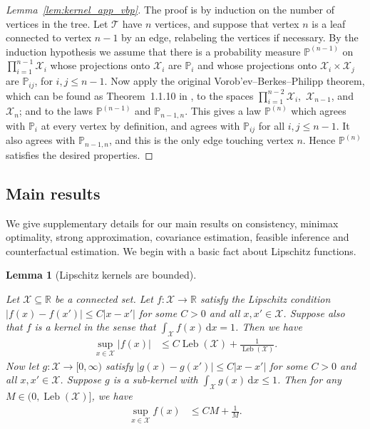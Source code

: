 \documentclass[11pt,lof]{puthesis}
\renewcommand{\P}{\ensuremath{\mathbb{P}}}
\newcommand{\R}{\ensuremath{\mathbb{R}}}
\newcommand{\cX}{\ensuremath{\mathcal{X}}}
\newcommand{\cT}{\ensuremath{\mathcal{T}}}
\DeclareMathOperator{\Leb}{Leb}
\newcommand{\diff}[1]{\,\mathrm{d}#1}
\theoremstyle{break}
\newtheorem{lemma}{Lemma}[section]
\theoremstyle{proof}
\newtheorem{proof}{Proof}
\begin{document}
\begin{proof}[Lemma~\ref{lem:kernel_app_vbp}]

The proof is by induction on the number of vertices in the tree.
Let $\cT$ have $n$ vertices,
and suppose that vertex $n$ is a leaf
connected to vertex $n-1$ by an edge,
relabeling the vertices if necessary.
By the induction hypothesis we assume that there is a
probability measure $\P^{(n-1)}$
on $\prod_{i=1}^{n-1} \cX_i$
whose projections onto $\cX_i$ are $\P_i$
and whose projections onto $\cX_i \times \cX_j$ are $\P_{i j}$,
for $i,j \leq n-1$.
Now apply the original
Vorob'ev--Berkes--Philipp theorem,
which can be found as Theorem~1.1.10 in
\citet{dudley1999uniform},
to the spaces
$\prod_{i=1}^{n-2} \cX_i$,\,
$\cX_{n-1}$, and
$\cX_n$;
and to the laws
$\P^{(n-1)}$
and
$\P_{n-1, n}$.
This gives a law $\P^{(n)}$
which agrees with $\P_i$
at every vertex by definition,
and agrees with
$\P_{i j}$ for all $i,j \leq n-1$.
It also agrees with $\P_{n-1,n}$,
and this is the only edge touching vertex $n$.
Hence $\P^{(n)}$ satisfies the desired properties.
\end{proof}

\subsection{Main results}
\label{sec:kernel_app_main}

We give supplementary details for our main results on consistency, minimax
optimality, strong approximation, covariance estimation, feasible inference and
counterfactual estimation.
We begin with a basic fact about Lipschitz functions.

\begin{lemma}[Lipschitz kernels are bounded]
\label{lem:kernel_app_lipschitz_kernels_bounded}

Let $\cX \subseteq \R$ be a connected set.
Let $f: \cX \to \R$ satisfy the Lipschitz condition
$|f(x) - f(x')| \leq C |x-x'|$ for some $C > 0$
and all $x, x' \in \cX$.
Suppose also that $f$ is a kernel in the sense that
$\int_\cX f(x) \diff{x} = 1$.
Then we have
%
\begin{align*}
\sup_{x \in \cX} |f(x)|
&\leq
C \Leb(\cX) + \frac{1}{\Leb(\cX)}.
\end{align*}
%
Now let $g: \cX \to [0,\infty)$ satisfy
$|g(x) - g(x')| \leq C |x-x'|$ for some $C > 0$
and all $x, x' \in \cX$.
Suppose $g$ is a sub-kernel with
$\int_\cX g(x) \diff{x} \leq 1$.
Then for any $M \in \big(0, \Leb(\cX)\big]$,
we have
%
\begin{align*}
\sup_{x \in \cX} f(x)
&\leq
C M + \frac{1}{M}.
\end{align*}

\end{lemma}
\end{document}
